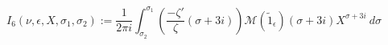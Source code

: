 \begin{definition}[I₆]
\label{I6}
\leanok
$$
  I_6(\nu, \epsilon, X, \sigma_1, \sigma_2) := \frac{1}{2\pi i} \int_{\sigma_2}^{\sigma_1}
  \left(
  \frac{-\zeta'}\zeta(\sigma + 3 i)
  \right)
    \mathcal M(\widetilde 1_\epsilon)(\sigma + 3 i)
  X^{\sigma + 3 i} \ d\sigma
  $$
\end{definition}
